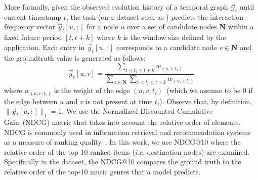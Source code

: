More formally, given the observed evolution history of a temporal graph $\mathcal{G}_t$ until current timestamp $t$, the  task (on a dataset such as \fm) predicts the interaction frequency vector $\Vec{y}_t[u,:]$ for a node $u$ over a set of candidate nodes $\mathbf{N}$ within a fixed future period $[t,t+k]$ where $k$ is the window size defined by the application. 
Each entry in $\Vec{y}_t[u,:]$ corresponds to a candidate node $v \in \mathbf{N}$ and the groundtruth value is generated as follows:
\begin{equation}
    \Vec{y}_t[u,v] = \frac{ \sum_{ t < t_i \leq t+k} w_{(u,v,t_i)}}{\sum_{z \in \mathbf{N}} \sum_{ t < t_i \leq t+k} w_{(u,z,t_i)}}
\end{equation}
where $w_{(u,v,t_i)}$ is the weight of the edge $(u,v,t_i)$~(which we assume to be $0$ if the edge between $u$ and $v$ is not present at time $t_i$).
Observe that, by definition, $\|\Vec{y}_t[u,:]\|_1 = 1$. 
We use the Normalized Discounted Cumulative Gain~(NDCG) metric that takes into account the relative order of elements.
NDCG is commonly used in information retrieval and recommendation systems as a measure of ranking quality~\cite{jarvelin2002cumulated}. 
In this work, we use NDCG@10 where the relative order of the top 10 ranked items (\emph{i.e.} destination nodes) are examined. 
Specifically in the \fm dataset, the NDCG@10 compares the ground truth to the relative order of the top-10 music genres that a model predicts. 




